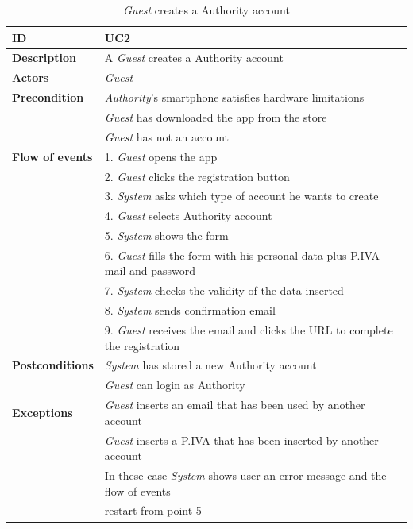 \documentclass{article}
\begin{document}
\clearpage
\begin{table}
    \begin{center}
    \centering
\begin{tabular}{ | l | l |}
\hline
\textbf{ID} & UC2 \\
\hline
\textbf{Description} & A \textit{Guest} creates a Authority account \\
\hline
\textbf{Actors} & \textit{Guest} \\
\hline
\textbf{Precondition} & \textit{Authority}'s smartphone satisfies hardware limitations \\
             & \textit{Guest} has downloaded the app from the store \\
             & \textit{Guest} has not an account\\ 
\hline
\textbf{Flow of events} & 1. \textit{Guest} opens the app \\
                        & 2. \textit{Guest} clicks the registration button \\
                        & 3. \textit{System} asks which type of account he wants to create \\
                        & 4. \textit{Guest} selects Authority account \\
                        & 5. \textit{System} shows the form \\
                        & 6. \textit{Guest} fills the form with his personal data plus P.IVA mail and password \\
                        & 7. \textit{System} checks the validity of the data inserted \\
                        & 8. \textit{System} sends confirmation email \\
                        & 9. \textit{Guest} receives the email and clicks the URL to complete the registration \\  
\hline
\textbf{Postconditions} & \textit{System} has stored a new Authority account  \\
                        & \textit{Guest} can login as Authority \\
\hline
\textbf{Exceptions} & \textit{Guest} inserts an email that has been used by another account \\
                    & \textit{Guest} inserts a P.IVA that has been inserted by another account \\
                    & In these case \textit{System} shows user an error message and the flow of events  \\
                    & restart from point 5 \\  
\hline
\end{tabular}
\caption{\textit{Guest} creates a Authority account}
\end{center}
\end{table}
\end{document}
